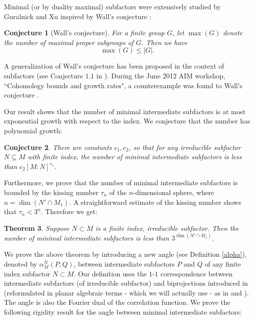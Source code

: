 \documentclass[11pt,letterpaper]{amsart}
\newtheorem{theorem}{Theorem}[section]
\newtheorem{conjecture}[theorem]{Conjecture}
\theoremstyle{definition}
\theoremstyle{remark}
\begin{document}
Minimal (or by duality maximal) subfactors were extensively studied by Guralnick and Xu \cite{GX} inspired by Wall's conjecture  \cite{Wal61}: 
\begin{conjecture}[Wall's conjecture]
	For a finite group $G$, let $\max(G)$ denote the number of maximal proper subgroups of $G$. Then we have
	\begin{equation*}
	\max(G)\leq \vert G\vert.
	\end{equation*}
\end{conjecture}
A generalization of Wall's conjecture has been proposed in the context of subfactors (see Conjecture $1.1$ in \cite{GX}).
During the June 2012 AIM workshop, ``Cohomology bounds and growth rates", a counterexample was found to Wall's conjecture \cite{GHPS12}.



Our result shows that the number of minimal intermediate subfactors is at most exponential growth with respect to the index. 
We conjecture that the number has polynomial growth:
\begin{conjecture}
There are constants $c_1, c_2$, so that for any irreducible subfactor $N \subseteq M$  with finite index, the number of minimal intermediate subfactors is less than $c_2[M:N]^{c_1}$.
\end{conjecture}


Furthermore, we prove that the number of minimal intermediate subfactors is bounded by the kissing number $\tau_n$ of the $n$-dimensional sphere, where $n=\dim (N'\cap M_1)$. 
A straightforward estimate of the kissing number shows that $\tau_n < 3^n$. Therefore we get:
\begin{theorem}\label{Thm:min}
Suppose $N\subset M$ is a finite index, irreducible subfactor. Then the number of minimal intermediate subfactors is less than $3^{\dim (N'\cap M_1)}$.
\end{theorem}  



We prove the above theorem by introducing a new angle (see Definition \ref{alpha}), denoted by $\alpha^N_M(P,Q)$, between intermediate subfactors $P$ and $Q$ of any finite index subfactor $N\subset M$. Our definition uses the $1$-$1$ correspondence between intermediate subfactors (of irreducible subfactor) and biprojections introduced in \cite{Bi1} (reformulated in planar algebraic terms - which we will actually use - as in \cite{La} and \cite{BiJo2}). The angle is also the Fourier dual of the correlation function. 
We prove the following rigidity result for the angle between minimal intermediate subfactors:
\end{document}
